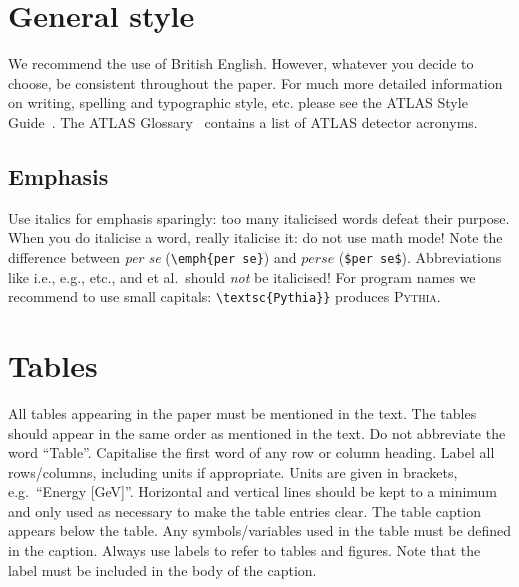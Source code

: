 \documentclass[UKenglish]{latex/atlasdoc}
\begin{document}
\section{General style}
\label{sec:english}

We recommend the use of British English. However, whatever you decide
to choose, be consistent throughout the paper. For much more detailed
information on writing, spelling and typographic style, etc. please
see the ATLAS Style Guide~\cite{atlas-style}. 
The ATLAS Glossary~\cite{atlas-glossary} contains a list of ATLAS detector acronyms.


\subsection{Emphasis}
\label{sec:emphasis}

Use italics for emphasis sparingly: too many italicised words defeat
their purpose. When you do italicise a word, really italicise it: do
not use math mode! Note the difference between \emph{per se}
(\verb|\emph{per se}|) and $per se$ (\verb+$per se$+). Abbreviations
like i.e., e.g., etc., and et al.\ should \emph{not} be italicised!
For program names we recommend to use small capitals:
\verb|\textsc{Pythia}}| produces \textsc{Pythia}.


\section{Tables}
\label{sec:table}

All tables appearing in the paper must be mentioned in the text. The
tables should appear in the same order as mentioned in the text. Do
not abbreviate the word \enquote{Table}. Capitalise the first word of any
row or column heading. Label all rows/columns, including units if
appropriate. Units are given in brackets, e.g.\ \enquote{Energy [\si{\GeV}]}.
Horizontal and vertical lines should be kept to a minimum and only used 
as necessary to make the table entries clear.
The table caption appears below the table.
Any symbols/variables used in the table must be defined in the
caption.  Always use labels to refer to tables and figures. Note that
the label must be included in the body of the caption.
\end{document}
